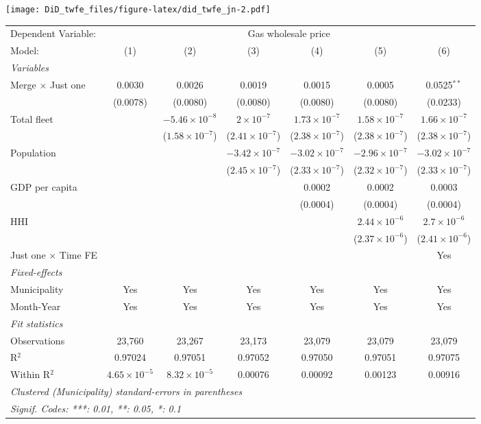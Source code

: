 \documentclass[
]{article}
\begin{document}
\texttt{[image: DiD\_twfe\_files/figure-latex/did\_twfe\_jn-2.pdf]}

\begin{tabular}{lcccccc}
\tabularnewline\midrule\midrule
Dependent Variable:&\multicolumn{6}{c}{Gas wholesale price}\\
Model:&(1) & (2) & (3) & (4) & (5) & (6)\\
\midrule \emph{Variables}&   &   &   &   &   &  \\
Merge $\times $ Just one & 0.0030 & 0.0026 & 0.0019 & 0.0015 & 0.0005 & 0.0525$^{**}$\\
  &(0.0078) & (0.0080) & (0.0080) & (0.0080) & (0.0080) & (0.0233)\\
Total fleet &    & $-5.46\times 10^{-8}$ & $2\times 10^{-7}$ & $1.73\times 10^{-7}$ & $1.58\times 10^{-7}$ & $1.66\times 10^{-7}$\\
  &   & ($1.58\times 10^{-7}$) & ($2.41\times 10^{-7}$) & ($2.38\times 10^{-7}$) & ($2.38\times 10^{-7}$) & ($2.38\times 10^{-7}$)\\
Population &    &    & $-3.42\times 10^{-7}$ & $-3.02\times 10^{-7}$ & $-2.96\times 10^{-7}$ & $-3.02\times 10^{-7}$\\
  &   &    & ($2.45\times 10^{-7}$) & ($2.33\times 10^{-7}$) & ($2.32\times 10^{-7}$) & ($2.33\times 10^{-7}$)\\
GDP per capita &    &    &    & 0.0002 & 0.0002 & 0.0003\\
  &   &    &    & (0.0004) & (0.0004) & (0.0004)\\
HHI &    &    &    &    & $2.44\times 10^{-6}$ & $2.7\times 10^{-6}$\\
  &   &    &    &    & ($2.37\times 10^{-6}$) & ($2.41\times 10^{-6}$)\\
Just one $\times$ Time FE &  &  &  &  &  & Yes\\
\midrule \emph{Fixed-effects}&   &   &   &   &   &  \\
Municipality & Yes & Yes & Yes & Yes & Yes & Yes\\
Month-Year & Yes & Yes & Yes & Yes & Yes & Yes\\
\midrule \emph{Fit statistics}&  & & & & & \\
Observations & 23,760&23,267&23,173&23,079&23,079&23,079\\
R$^2$ & 0.97024&0.97051&0.97052&0.97050&0.97051&0.97075\\
Within R$^2$ & $4.65\times 10^{-5}$&$8.32\times 10^{-5}$&0.00076&0.00092&0.00123&0.00916\\
\midrule\midrule\multicolumn{7}{l}{\emph{Clustered (Municipality) standard-errors in parentheses}}\\
\multicolumn{7}{l}{\emph{Signif. Codes: ***: 0.01, **: 0.05, *: 0.1}}\\
\end{tabular}
\end{document}
